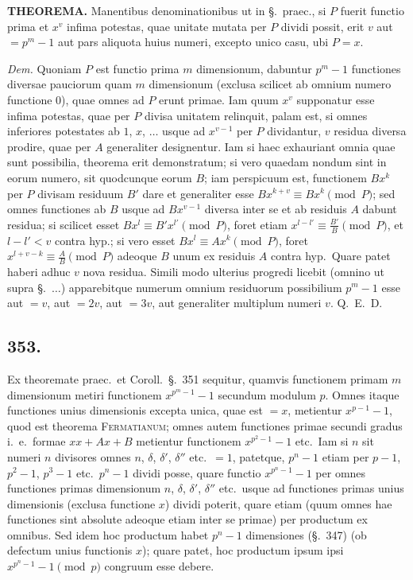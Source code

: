 \documentclass[12pt]{article}
\newcommand{\Sec}{\S}
\begin{document}
\textbf{THEOREMA.} Manentibus denominationibus ut in \S.~praec., si $P$ fuerit functio prima et $x^v$ infima potestas, quae unitate mutata per $P$ dividi possit, erit $v$ aut $=p^m-1$ aut pars aliquota huius numeri, excepto unico casu, ubi $P=x$.

\textit{Dem.} Quoniam $P$ est functio prima $m$ dimensionum, dabuntur $p^m-1$ functiones diversae pauciorum quam $m$ dimensionum (exclusa scilicet ab omnium numero functione $0$), quae omnes ad $P$ erunt primae. Iam quum $x^v$ supponatur esse infima potestas, quae per $P$ divisa unitatem relinquit, palam est, si omnes inferiores potestates ab $1$, $x$, $\ldots$ usque ad $x^{v-1}$ per $P$ dividantur, $v$ residua diversa prodire, quae per $A$ generaliter designentur. Iam si haec exhauriant omnia quae sunt possibilia, theorema erit demonstratum; si vero quaedam nondum sint in eorum numero, sit quodcunque eorum $B$; iam perspicuum est, functionem $Bx^k$ per $P$ divisam residuum $B'$ dare et generaliter esse $Bx^{k+v}\equiv Bx^k\pmod{P}$; sed omnes functiones ab $B$ usque ad $Bx^{v-1}$ diversa inter se et ab residuis $A$ dabunt residua; si scilicet esset $Bx^l\equiv B'x^{l'}\pmod{P}$, foret etiam $x^{l-l'}\equiv \frac{B'}{B}\pmod{P}$, et $l-l'<v$ contra hyp.; si vero esset $Bx^l\equiv A x^k\pmod{P}$, foret $x^{l+v-k}\equiv \frac{A}{B}\pmod{P}$ adeoque $B$ unum ex residuis $A$ contra hyp.~Quare patet haberi adhuc $v$ nova residua. Simili modo ulterius progredi licebit (omnino ut supra \Sec.~$\ldots$) apparebitque numerum omnium residuorum possibilium $p^m-1$ esse aut $=v$, aut $=2v$, aut $=3v$, aut generaliter multiplum numeri $v$. Q.~E.~D.

\subsection*{353.}

Ex theoremate praec.~et Coroll.~\Sec.~351 sequitur, quamvis functionem primam $m$ dimensionum metiri functionem $x^{p^m-1}-1$ secundum modulum $p$. Omnes itaque functiones unius dimensionis excepta unica, quae est $=x$, metientur $x^{p-1}-1$, quod est theorema \textsc{Fermatianum}; omnes autem functiones primae secundi gradus i.~e.~formae $xx+Ax+B$ metientur functionem $x^{p^2-1}-1$ etc.~Iam si $n$ sit numeri $n$ divisores omnes $n$, $\delta$, $\delta'$, $\delta''$ etc.~$=1$, patetque, $p^n-1$ etiam per $p-1$, $p^2-1$, $p^3-1$ etc.~$p^n-1$ dividi posse, quare functio $x^{p^n-1}-1$ per omnes functiones primas dimensionum $n$, $\delta$, $\delta'$, $\delta''$ etc.~usque ad functiones primas unius dimensionis (exclusa functione $x$) dividi poterit, quare etiam (quum omnes hae functiones sint absolute adeoque etiam inter se primae) per productum ex omnibus. Sed idem hoc productum habet $p^n-1$ dimensiones (\Sec.~347) (ob defectum unius functionis $x$); quare patet, hoc productum ipsum ipsi $x^{p^n-1}-1\pmod{p}$ congruum esse debere.
\end{document}
